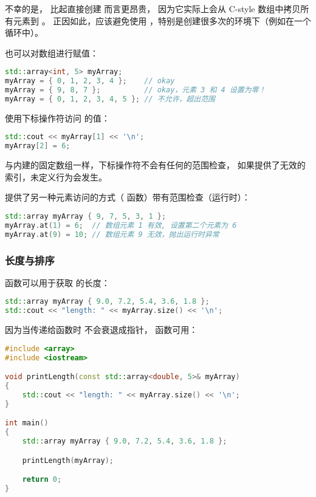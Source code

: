\documentclass[../../LearnCpp.tex]{subfiles}
\begin{document}
不幸的是， 比起直接创建  而言更昂贵，
因为它实际上会从 C-style 数组中拷贝所有元素到 。
正因如此，应该避免使用 ，特别是创建很多次的环境下（例如在一个循环中）。

也可以对数组进行赋值：

\begin{lstlisting}[language=C++]
std::array<int, 5> myArray;
myArray = { 0, 1, 2, 3, 4 };    // okay
myArray = { 9, 8, 7 };          // okay，元素 3 和 4 设置为零！
myArray = { 0, 1, 2, 3, 4, 5 }; // 不允许，超出范围
\end{lstlisting}

使用下标操作符访问  的值：

\begin{lstlisting}[language=C++]
std::cout << myArray[1] << '\n';
myArray[2] = 6;
\end{lstlisting}

与内建的固定数组一样，下标操作符不会有任何的范围检查，
如果提供了无效的索引，未定义行为会发生。

 提供了另一种元素访问的方式（ 函数）带有范围检查（运行时）：

\begin{lstlisting}[language=C++]
std::array myArray { 9, 7, 5, 3, 1 };
myArray.at(1) = 6;  // 数组元素 1 有效, 设置第二个元素为 6
myArray.at(9) = 10; // 数组元素 9 无效，抛出运行时异常
\end{lstlisting}

\subsubsection*{长度与排序}

 函数可以用于获取  的长度：

\begin{lstlisting}[language=C++]
std::array myArray { 9.0, 7.2, 5.4, 3.6, 1.8 };
std::cout << "length: " << myArray.size() << '\n';
\end{lstlisting}

因为当传递给函数时  不会衰退成指针， 函数可用：

\begin{lstlisting}[language=C++]
#include <array>
#include <iostream>

void printLength(const std::array<double, 5>& myArray)
{
    std::cout << "length: " << myArray.size() << '\n';
}

int main()
{
    std::array myArray { 9.0, 7.2, 5.4, 3.6, 1.8 };

    printLength(myArray);

    return 0;
}
\end{lstlisting}
\end{document}
